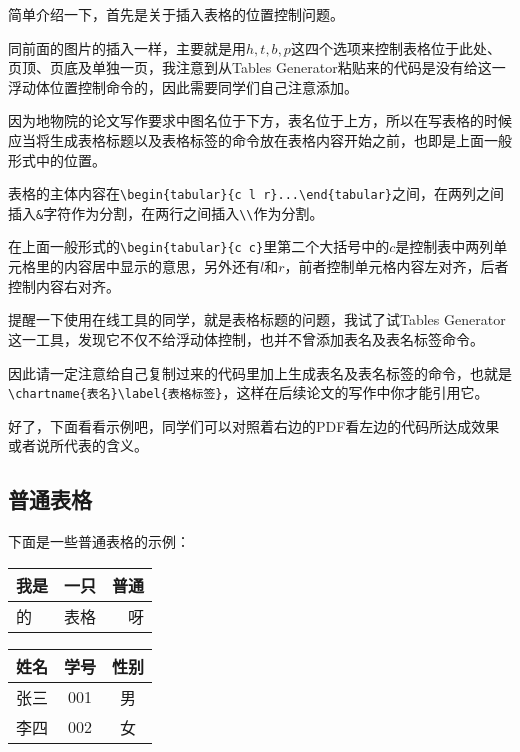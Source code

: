 简单介绍一下，首先是关于插入表格的位置控制问题。

同前面的图片的插入一样，主要就是用$h,t,b,p$这四个选项来控制表格位于此处、页顶、页底及单独一页，我注意到从Tables Generator粘贴来的代码是没有给这一浮动体位置控制命令的，因此需要同学们自己注意添加。

因为地物院的论文写作要求中图名位于下方，表名位于上方，所以在写表格的时候应当将生成表格标题以及表格标签的命令放在表格内容开始之前，也即是上面一般形式中的位置。

表格的主体内容在\verb|\begin{tabular}{c l r}...\end{tabular}|之间，在两列之间插入\verb|&|字符作为分割，在两行之间插入\verb|\\|作为分割。
\par
在上面一般形式的\verb|\begin{tabular}{c c}|里第二个大括号中的$c$是控制表中两列单元格里的内容居中显示的意思，另外还有$l$和$r$，前者控制单元格内容左对齐，后者控制内容右对齐。

提醒一下使用在线工具的同学，就是表格标题的问题，我试了试Tables Generator这一工具，发现它不仅不给浮动体控制，也并不曾添加表名及表名标签命令。\par 因此请一定注意给自己复制过来的代码里加上生成表名及表名标签的命令，也就是\verb|\chartname{表名}\label{表格标签}|，这样在后续论文的写作中你才能引用它。

好了，下面看看示例吧，同学们可以对照着右边的PDF看左边的代码所达成效果或者说所代表的含义。

\subsection{普通表格}
下面是一些普通表格的示例：

\begin{table}[ht]
\begin{minipage}[t]{0.45\textwidth}
  \centering
  \label{tab:1}
  \begin{tabular}{|l|c|r|}
    \hline
    我是& 一只 & 普通\\
    \hline
    的& 表格& 呀\\
    \hline
  \end{tabular}
\end{minipage}
\begin{minipage}[t]{0.45\textwidth}
  \centering
  \label{tab:2}
  \begin{tabular}{ccc}
    \hline
    姓名& 学号& 性别\\
    \hline
    张三& 001& 男\\
    李四& 002& 女\\
    \hline
  \end{tabular}
\end{minipage}  
\end{table}

